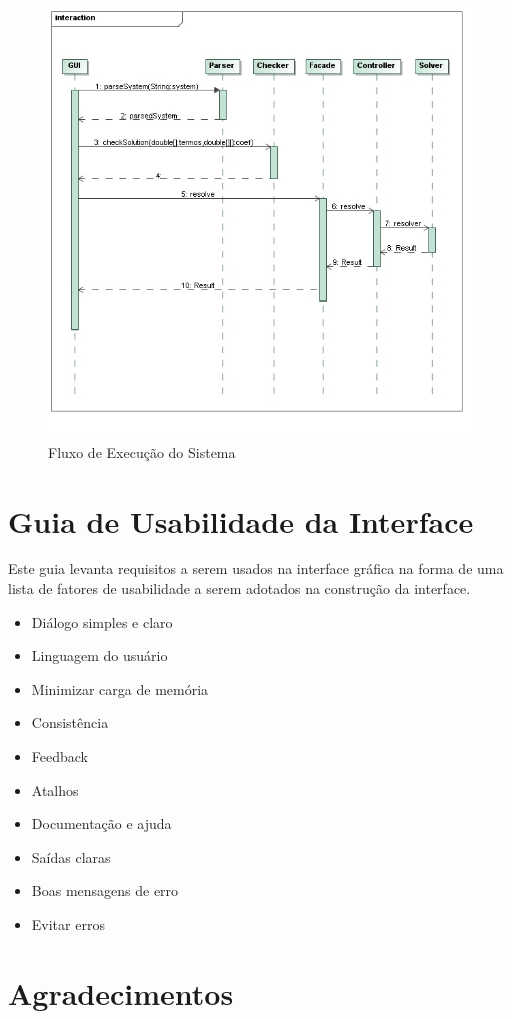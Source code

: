 \documentclass[a4paper,10pt]{report}
\begin{document}
\begin{figure}
 \centering
 \includegraphics[width=\textwidth]{MSNFlow}
 \caption{Fluxo de Execução do Sistema}
 \label{fig:fluxo}
\end{figure}

\section{Guia de Usabilidade da Interface}

Este guia levanta requisitos a serem usados na interface gráfica na forma de uma lista de fatores de usabilidade a serem adotados na construção da interface. 

\begin{itemize}
 \item Diálogo simples e claro 
 \item Linguagem do usuário
 \item Minimizar carga de memória
 \item Consistência
 \item Feedback
 \item Atalhos
 \item Documentação e ajuda
 \item Saídas claras
 \item Boas mensagens de erro
 \item Evitar erros
\end{itemize}

\section*{Agradecimentos}


\end{document}
